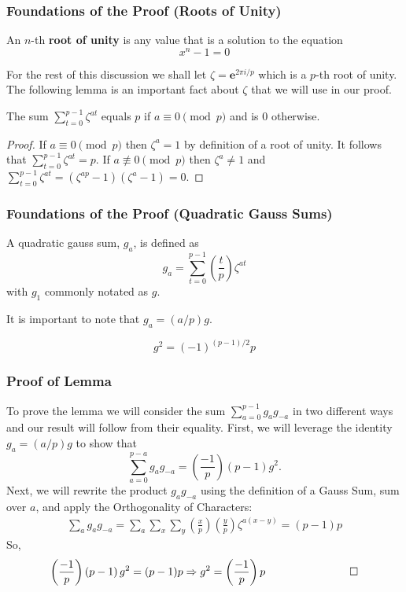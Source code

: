 \documentclass{beamer}
\begin{document}
\begin{frame}
    \frametitle{Foundations of the Proof (Roots of Unity)}
    \begin{definition}
        An $n$-th \textbf{root of unity} is any value that is a solution to the equation 
        \[
            x^{n} - 1 = 0
        \]
    \end{definition}
    For the rest of this discussion we shall let $\zeta = \mathbf{e}^{2\pi i/p}$ which is a $p$-th root of unity. The following lemma is an important fact about $\zeta$ that we will use in our proof.
    \begin{lemma}
        The sum $\sum_{t=0}^{p-1}\zeta^{at}$ equals $p$ if $a\equiv 0 \pmod{p}$ and is $0$ otherwise.
    \end{lemma}
    \begin{proof}
        If $a \equiv 0 \pmod{p}$ then $\zeta^{a} = 1$ by definition of a root of unity. It follows that $\sum_{t=0}^{p-1}\zeta^{at} = p$. If $a \not\equiv 0 \pmod{p}$ then $\zeta^a \neq 1$ and $ \sum_{t=0}^{p-1}\zeta^{at} = \left(\zeta^{ap} - 1\right)\left(\zeta^{a}-1\right) = 0$.
    \end{proof}
\end{frame}

\begin{frame}
    \frametitle{Foundations of the Proof (Quadratic Gauss Sums)}
    \begin{definition}
        A quadratic gauss sum, $g_a$, is defined as 
        \[
            g_a = \sum_{t=0}^{p-1} \left(\frac{t}{p}\right)\zeta^{at}
        \]
        with $g_1$ commonly notated as $g$.
    \end{definition}
    It is important to note that $g_a = (a/p)g$. 
    \begin{lemma}
        \[ g^2 = \left(-1\right)^{(p-1)/2}p \]
    \end{lemma}
\end{frame}

\begin{frame}
    \frametitle{Proof of Lemma}
        To prove the lemma we will consider the sum $\sum_{a=0}^{p-1}g_{a}g_{-a}$ in two different ways and our result will follow from their equality. First, we will leverage the identity $g_a = \left(a/p\right)g$ to show that 
        \[
            \sum_{a=0}^{p-a}g_{a}g_{-a} = \left(\frac{-1}{p}\right)\left(p-1\right)g^2.
        \]
        Next, we will rewrite the product $g_{a}g_{-a}$ using the definition of a Gauss Sum, sum over $a$, and apply the Orthogonality of Characters:
        \begin{align*}
            \sum_{a}g_{a}g_{-a} = \sum_{a}\sum_{x}\sum_{y} \left(\frac{x}{p}\right)\left(\frac{y}{p}\right)\zeta^{a\left(x-y\right)} = (p-1)p
        \end{align*}
        So, 
        \[
            \left(\frac{-1}{p}\right)\left(p-1\right)g^2 = (p-1)p \Rightarrow g^2 = \left(\frac{-1}{p}\right)p \hspace{2cm}\qed
        \]
        
\end{frame}
\end{document}
